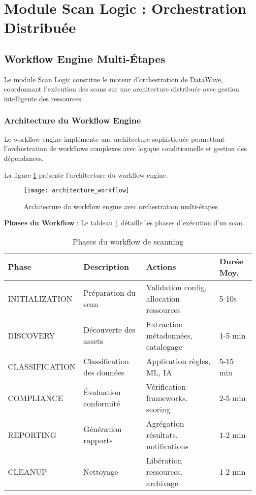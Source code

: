 
\section{Module Scan Logic : Orchestration Distribuée}

\subsection{Workflow Engine Multi-Étapes}

Le module Scan Logic constitue le moteur d'orchestration de DataWave, coordonnant l'exécution des scans sur une architecture distribuée avec gestion intelligente des ressources.

\subsubsection{Architecture du Workflow Engine}

Le workflow engine implémente une architecture sophistiquée permettant l'orchestration de workflows complexes avec logique conditionnelle et gestion des dépendances.

La figure \ref{fig:architecture_workflow} présente l'architecture du workflow engine.

\begin{figure}[htpb]
\centering
\texttt{[image: architecture\_workflow]}
\caption{Architecture du workflow engine avec orchestration multi-étapes}
\label{fig:architecture_workflow}
\end{figure}

\textbf{Phases du Workflow} : Le tableau \ref{tab:phases_workflow} détaille les phases d'exécution d'un scan.

\begin{table}[htpb]
\centering
\caption{Phases du workflow de scanning}
\label{tab:phases_workflow}
\begin{tabular}{|p{}|p{}|p{}|p{}|}
\hline
\textbf{Phase} & \textbf{Description} & \textbf{Actions} & \textbf{Durée Moy.} \\
\hline
INITIALIZATION & Préparation du scan & Validation config, allocation ressources & 5-10s \\
\hline
DISCOVERY & Découverte des assets & Extraction métadonnées, catalogage & 1-5 min \\
\hline
CLASSIFICATION & Classification des données & Application règles, ML, IA & 5-15 min \\
\hline
COMPLIANCE & Évaluation conformité & Vérification frameworks, scoring & 2-5 min \\
\hline
REPORTING & Génération rapports & Agrégation résultats, notifications & 1-2 min \\
\hline
CLEANUP & Nettoyage & Libération ressources, archivage & 1-2 min \\
\hline
\end{tabular}
\end{table}

